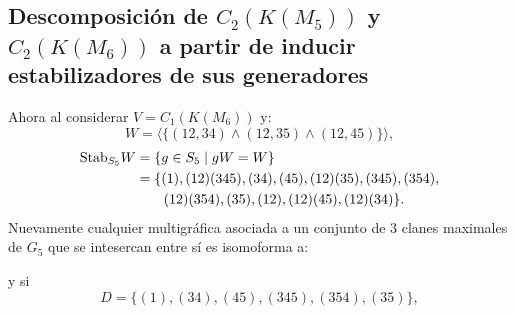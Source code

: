 \documentclass[12pt]{book}
\theoremstyle{definition}
\newcounter{in}
\begin{document}
\subsection{Descomposición de $C_{2}(K(M_5))$ y $C_{2}(K(M_6))$ a partir de inducir estabilizadores de sus generadores}
\label{Ind_est_o_2}

Ahora al considerar $V = C_{1}(K(M_{6}))$ y:
$$W = \langle \{(12,34) \wedge (12,35) \wedge (12,45) \} \rangle,$$
\begin{equation*}
    \begin{aligned}
      \textup{Stab}_{S_{5}} W &=\{g\in S_{5}\mid gW=W\}\\
      &=\{(1),(12)(345), (34), (45), (12)(35), (345), (354),\\
      &\qquad{}(12)(354), (35), (12), (12)(45), (12)(34)\}.
    \end{aligned}
\end{equation*}
Nuevamente cualquier multigráfica asociada a un conjunto de $3$ clanes maximales de $G_{5}$ que se intesercan entre sí es isomoforma a:
\begin{center}
\end{center}
y si
\begin{equation*}
      D =\{(1), (34), (45), (345), (354), (35)\},
\end{equation*}
\end{document}
